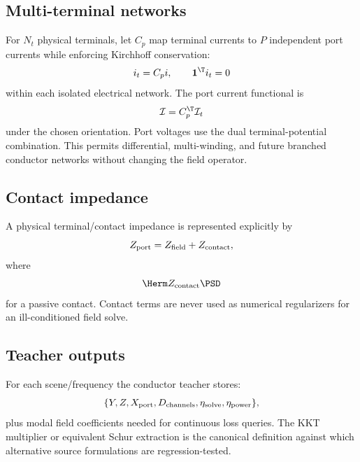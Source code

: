 \subsection{Multi-terminal networks}

For $N_t$ physical terminals, let $C_p$ map terminal currents to $P$ independent
port currents while enforcing Kirchhoff conservation:
\[
  i_t=C_p i,\qquad \mathbf 1^\T i_t=0
\]
within each isolated electrical network. The port current functional is
\[
  \mathcal I=C_p^\T\mathcal I_t
\]
under the chosen orientation. Port voltages use the dual terminal-potential
combination. This permits differential, multi-winding, and future branched
conductor networks without changing the field operator.

\subsection{Contact impedance}

A physical terminal/contact impedance is represented explicitly by
\[
  Z_{\rm port}
  =
  Z_{\rm field}+Z_{\rm contact},
\]
where
\[
 \Herm Z_{\rm contact}\PSD
\]
for a passive contact. Contact terms are never used as numerical regularizers
for an ill-conditioned field solve.

\subsection{Teacher outputs}

For each scene/frequency the conductor teacher stores:
\[
  \{Y,Z,X_{\rm port},D_{\rm channels},
    \eta_{\rm solve},\eta_{\rm power}\},
\]
plus modal field coefficients needed for continuous loss queries. The KKT
multiplier or equivalent Schur extraction is the canonical definition against
which alternative source formulations are regression-tested.
